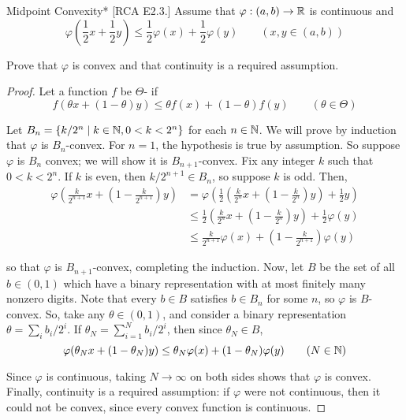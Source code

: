 \begin{problem}{Midpoint Convexity}*
    [RCA E2.3.] Assume that \(\varphi: (a, b) \to \mathbb{R}\) is continuous and 
    \[
        \varphi \left(\frac{1}{2}x + \frac{1}{2}y\right) \leq \frac{1}{2} \varphi(x) + \frac{1}{2}\varphi(y)
        \qquad (x, y \in (a, b))
    \]

    Prove that \(\varphi\) is convex and that continuity is a required assumption. 
\end{problem}

\begin{proof}
    Let a function \(f\) be \(\Theta\)- if 
    \[
        f(\theta x + (1 - \theta) y) \leq \theta f(x) + (1 - \theta) f(y) 
        \qquad (\theta \in \Theta)
    \]

    Let \(B_n = \{k / 2^n \mid k \in \mathbb{N}, 0 < k < 2^n\}\) for each \(n \in \mathbb{N}\). We will prove by induction that \(\varphi\) is \(B_n\)-convex. For \(n=1\), the hypothesis is true by assumption. So suppose \(\varphi\) is \(B_n\) convex; we will show it is \(B_{n+1}\)-convex. Fix any integer \(k\) such that \(0 < k < 2^n\). If \(k\) is even, then \(k/2^{n+1} \in B_n\), so suppose \(k\) is odd. Then, 
    \begin{align*}
        \varphi \left( \frac{k}{2^{n+1}} x + \left(1 - \frac{k}{2^{n+1}}\right) y \right)
        &= \varphi \left( \frac{1}{2} \left( \frac{k}{2^n} x + \left(1 - \frac{k}{2^n}\right) y \right) + \frac{1}{2} y \right) \\
        &\leq \frac{1}{2} \left( \frac{k}{2^n} x + \left( 1 - \frac{k}{2^n} \right) y \right) + \frac{1}{2} \varphi(y) \\
        &\leq \frac{k}{2^{n+1}} \varphi(x) + \left(1 - \frac{k}{2^{n+1}} \right) \varphi(y)
    \end{align*}

    so that \(\varphi\) is \(B_{n+1}\)-convex, completing the induction. Now, let \(B\) be the set of all \(b \in (0, 1)\) which have a binary representation with at most finitely many nonzero digits. Note that every \(b \in B\) satisfies \(b \in B_n\) for some \(n\), so \(\varphi\) is \(B\)-convex. So, take any \(\theta \in (0, 1)\), and consider a binary representation \(\theta = \sum_i b_i / 2^i\). If \(\theta_N = \sum_{i=1}^N b_i / 2^i\), then since \(\theta_N \in B\), 
    \[
        \varphi(\theta_N x + (1 - \theta_N) y) \leq \theta_N \varphi(x) + (1 - \theta_N) \varphi(y)
        \qquad (N \in \mathbb{N})
    \]

    Since \(\varphi\) is continuous, taking \(N \to \infty\) on both sides shows that \(\varphi\) is convex. Finally, continuity is a required assumption: if \(\varphi\) were not continuous, then it could not be convex, since every convex function is continuous. 
\end{proof}


